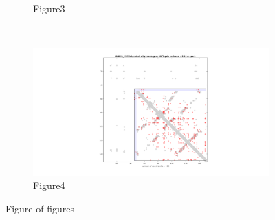 \documentclass[10pt]{article}\usepackage[]{graphicx}\usepackage[]{color}
\theoremstyle{plain}
\begin{document}
\begin{multicols*}{2}
\begin{figure}[p]
\begin{subfigure}[b]{.49\textwidth}
      \caption{Figure3}
      \label{fig:fig3}
    \end{subfigure}~
      \begin{subfigure}[b]{.5\textwidth}
      \includegraphics[width=\textwidth, trim= 10cm 0cm 10cm 0, clip]{../figures/fig4}
      \caption{Figure4}
      \label{fig:fig4}
    \end{subfigure}%
    \caption{Figure of figures}
    \label{fig:init_figures}
  \end{figure}



\end{multicols*}
\end{document}
